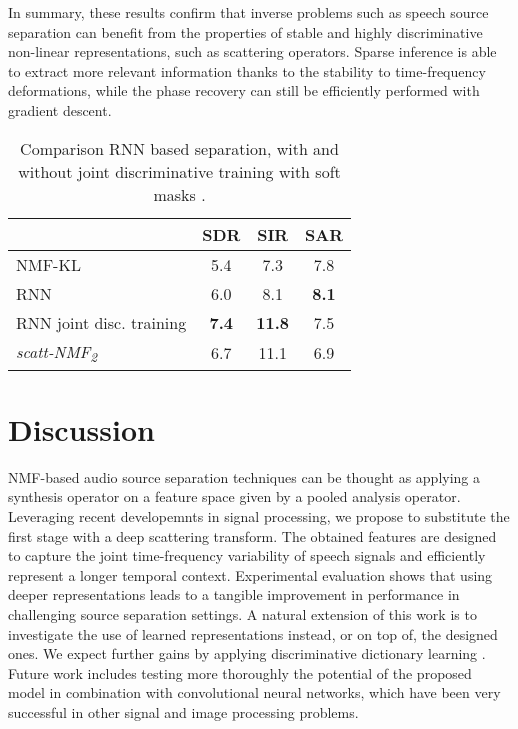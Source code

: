 In summary, these results confirm that inverse problems such as speech source separation 
can benefit from the properties of stable and highly discriminative non-linear representations, 
such as scattering operators. Sparse inference is able to extract more relevant information thanks 
to the stability to time-frequency deformations, while the phase recovery can still be efficiently performed
with gradient descent.



\begin{table}[tb]
\caption{Comparison RNN based separation, with and without joint discriminative training
with soft masks \cite{Huang_DNN_Separation_ICASSP2014}. \label{ta:eval2}}
\vspace{-1.5ex}
\begin{center}
\begin{tabular}{l|c|c|c}
  \hline\hline
& SDR & SIR & SAR \\
\hline
NMF-KL     & 5.4 &   7.3 &  7.8\\
\hline
RNN \cite{Huang_DNN_Separation_ICASSP2014} & 6.0  &   8.1 & {\bf 8.1}  \\
RNN joint disc. training \cite{Huang_DNN_Separation_ICASSP2014} & {\bf 7.4}  &   {\bf 11.8} & 7.5  \\
\hline
\emph{scatt-NMF\textsubscript{2}} &  6.7 & 11.1  & 6.9 \\
  \hline\hline
\end{tabular}
\end{center}
\vspace{-2.5ex}
\end{table}


\section{Discussion}
NMF-based audio source separation techniques can be thought as applying a synthesis operator on a feature space
given by a pooled analysis operator. Leveraging recent developemnts in signal processing, we propose to substitute
the first stage with a deep scattering transform. 
The obtained features are designed to capture the joint time-frequency variability of speech signals
and efficiently represent a longer temporal context. Experimental evaluation shows that using deeper representations
leads to a tangible improvement in performance in challenging source separation settings.
A natural extension of this work is to investigate the use of learned representations instead, or on top of,
the designed ones.
%
We expect further gains by applying discriminative dictionary learning \cite{sprechmann2014supervised}.
Future work includes testing more thoroughly the potential of the proposed model in combination
with convolutional neural networks, which have been very successful in other signal and image processing problems.

